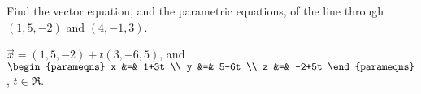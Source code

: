 
\begin{Exercise}[
name={},
title={}, 
difficulty=0,
origin={\cite{SM}}]

Find the vector equation, and the parametric equations, of the line through $(1,5,-2)$ and $(4,-1,3)$.

\end{Exercise}

\begin{Answer}
$\vec{x} = (1,5,-2)+t(3,-6,5)$, and $\begin{parameqns} x &=& 1+3t \\ y &=& 5-6t \\ z &=& -2+5t \end{parameqns}$, $t\in\Re$.
\end{Answer}
